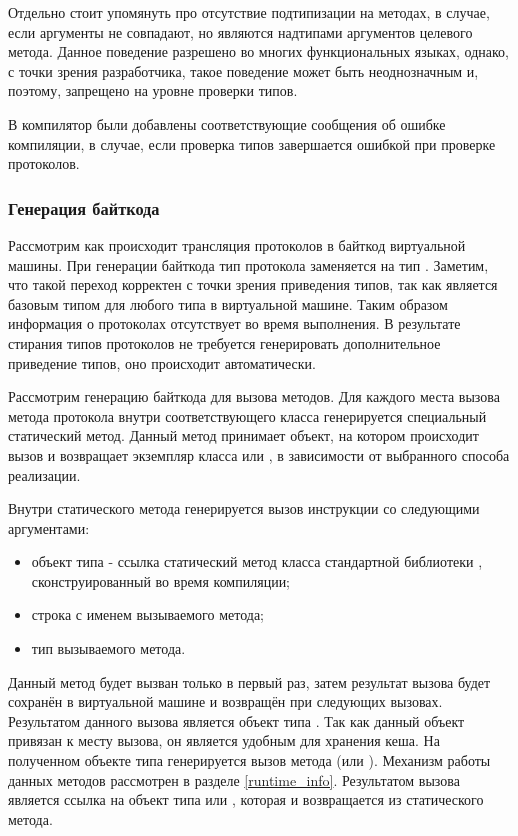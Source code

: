 Отдельно стоит упомянуть про отсутствие подтипизации на методах, в случае, если аргументы не совпадают, но являются надтипами аргументов целевого метода. Данное поведение разрешено во многих функциональных языках, однако, с точки зрения разработчика, такое поведение может быть неоднозначным и, поэтому, запрещено на уровне проверки типов.

В компилятор были добавлены соответствующие сообщения об ошибке компиляции, в случае, если проверка типов завершается ошибкой при проверке протоколов.

\subsubsection{Генерация байткода}
Рассмотрим как происходит трансляция протоколов в байткод виртуальной машины. При генерации байткода тип протокола заменяется на тип . Заметим, что такой переход корректен с точки зрения приведения типов, так как  является базовым типом для любого типа в виртуальной машине. Таким образом информация о протоколах отсутствует во время выполнения. В результате стирания типов протоколов не требуется генерировать дополнительное приведение типов, оно происходит автоматически.

Рассмотрим генерацию байткода для вызова методов. Для каждого места вызова метода протокола внутри соответствующего класса генерируется специальный статический метод. Данный метод принимает объект, на котором происходит вызов и возвращает экземпляр класса  или , в зависимости от выбранного способа реализации.

Внутри статического метода генерируется вызов инструкции  со следующими аргументами:
\begin{itemize}
  \item объект типа  - ссылка статический метод  класса стандартной библиотеки , сконструированный во время компиляции;
  \item строка с именем вызываемого метода;
  \item тип вызываемого метода.
\end{itemize}

Данный метод будет вызван только в первый раз, затем результат вызова будет сохранён в виртуальной машине и возвращён при следующих вызовах. Результатом данного вызова является объект типа . Так как данный объект привязан к месту вызова, он является удобным для хранения кеша. На полученном объекте типа  генерируется вызов метода (или ). Механизм работы данных методов рассмотрен в разделе \ref{runtime_info}. Результатом вызова является ссылка на объект типа  или , которая и возвращается из статического метода.

